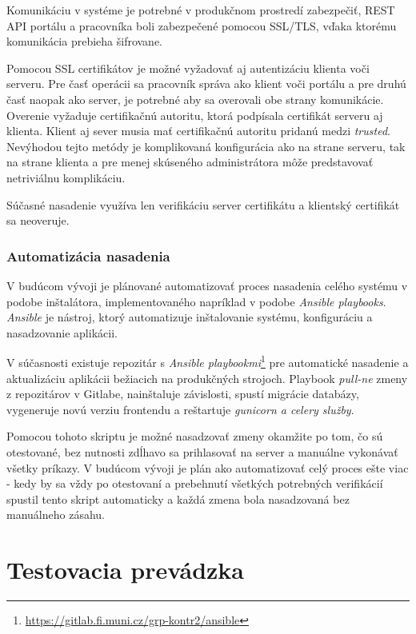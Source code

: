 \documentclass[
  digital, %
  twoside, %
  table,   %
  lof,     %
  lot,     %
]{fithesis3}
\begin{document}
Komunikáciu v systéme je potrebné v produkčnom prostredí zabezpečiť, REST API portálu a pracovníka boli zabezpečené pomocou SSL/TLS, vďaka ktorému komunikácia prebieha šifrovane. 

Pomocou SSL certifikátov je možné vyžadovať aj autentizáciu klienta voči serveru.
Pre časť operácii sa pracovník správa ako klient voči portálu a pre druhú časť naopak ako server, je potrebné aby sa overovali obe strany komunikácie. Overenie vyžaduje certifikačnú autoritu, ktorá podpísala certifikát serveru aj klienta\cite{RFC2818}. Klient aj sever musia mať certifikačnú autoritu pridanú medzi \emph{trusted}. Nevýhodou tejto metódy je komplikovaná konfigurácia ako na strane serveru, tak na strane klienta a pre menej skúseného administrátora môže predstavovať netriviálnu komplikáciu.

Súčasné nasadenie využíva len verifikáciu server certifikátu a klientský certifikát sa neoveruje.

\subsection{Automatizácia nasadenia}

V budúcom vývoji je plánované automatizovať proces nasadenia celého systému v podobe inštalátora, implementovaného napríklad v podobe \emph{Ansible playbooks}. \emph{Ansible} je nástroj, ktorý automatizuje inštalovanie systému, konfiguráciu a nasadzovanie aplikácii\cite{ansible}. 

V súčasnosti existuje repozitár s \emph{Ansible playbookmi}\footnote{\url{https://gitlab.fi.muni.cz/grp-kontr2/ansible}} pre automatické nasadenie a aktualizáciu aplikácii bežiacich na produkčných strojoch. Playbook \emph{pull-ne} zmeny z repozitárov v Gitlabe, nainštaluje závislosti, spustí migrácie databázy, vygeneruje novú verziu frontendu a reštartuje \emph{gunicorn a celery služby}.

Pomocou tohoto skriptu je možné nasadzovať zmeny okamžite po tom, čo sú otestované, bez nutnosti zdĺhavo sa prihlasovať na server a manuálne vykonávať všetky príkazy. V budúcom vývoji je plán ako automatizovať celý proces ešte viac - kedy by sa vždy po otestovaní a prebehnutí všetkých potrebných verifikácií spustil tento skript automaticky a každá zmena bola nasadzovaná bez manuálneho zásahu.

\chapter{Testovacia prevádzka}
\end{document}
